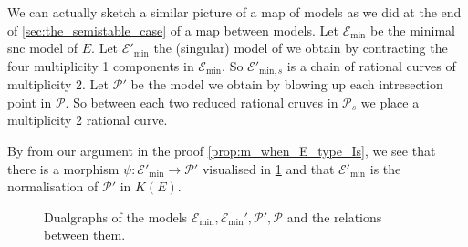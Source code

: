 We can actually sketch a similar picture of a map of models as we did at the end of \cref{sec:the_semistable_case} of a map between models. 
Let $\mathscr E_\text{min} $ be the minimal snc model of $E$. 
Let $\mathscr E'_{\text{min}}$ the (singular) model of we obtain by contracting the four multiplicity 1 components in  $\mathscr E_\text{min} $. 
So $\mathscr E'_{\text{min}, s} $ is a chain of rational curves of multiplicity 2. 
Let $\mathscr P'$ be the model we obtain by blowing up each intresection point in $\mathscr P$. 
So between each two reduced rational cruves in $\mathscr P_s$ we place a multiplicity 2 rational curve.

By from our argument in the proof \cref{prop:m_when_E_type_Is}, we see that there is a morphism $\psi: \mathscr E'_\text{min}  \to \mathscr P'$ visualised in \cref{fig:dualgraphs_is_models} and that $\mathscr E'_\text{min} $ is the normalisation of $\mathscr P'$ in  $K(E)$. 
\begin{figure}[ht]
    \centering
    \caption{Dualgraphs of the models $\mathscr E_\text{min} , \mathscr E_\text{min} ', \mathscr P', \mathscr P$ and the relations between them.}
    \label{fig:dualgraphs_is_models}
\end{figure}

